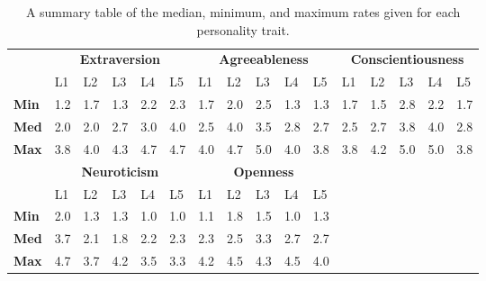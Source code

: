 \begin{table}[hbt!]
    \renewcommand{\arraystretch}{1}
    \begin{center}
        \begin{tabular}{p{}|
        p{}|p{}|p{}|p{}|p{}||
        p{}|p{}|p{}|p{}|p{}||
        p{}|p{}|p{}|p{}|p{}|}
            \cline{2-16}
            & \multicolumn{5}{c||}{\textbf{Extraversion}} & \multicolumn{5}{c||}{\textbf{Agreeableness}}
            & \multicolumn{5}{c|}{\textbf{Conscientiousness}} \\
            \cline{2-16}
            & L1 & L2 & L3 & L4 & L5 & L1 & L2 & L3 & L4 & L5 & L1 & L2 & L3 & L4 & L5      \\
            \cline{2-16}
            \textbf{Min}    & 1.2 & 1.7 & 1.3 & 2.2 & 2.3 & 1.7 & 2.0 & 2.5 & 1.3 & 1.3 & 1.7 & 1.5 & 2.8 & 2.2 & 1.7  \\
            \textbf{Med}    & 2.0 & 2.0 & 2.7 & 3.0 & 4.0 & 2.5 & 4.0 & 3.5 & 2.8 & 2.7 & 2.5 & 2.7 & 3.8 & 4.0 & 2.8  \\
            \textbf{Max}    & 3.8 & 4.0 & 4.3 & 4.7 & 4.7 & 4.0 & 4.7 & 5.0 & 4.0 & 3.8 & 3.8 & 4.2 & 5.0 & 5.0 & 3.8 \\
            \cline{2-16}
            \cline{2-11}
            &  \multicolumn{5}{|c||}{\textbf{Neuroticism}} & \multicolumn{5}{|c||}{\textbf{Openness}} \\
            \cline{2-11}
            & L1 & L2 & L3 & L4 & L5 & L1 & L2 & L3 & L4 & L5            \\
            \cline{2-11}
            \textbf{Min}    & 2.0 & 1.3 & 1.3 & 1.0 & 1.0 & 1.1 & 1.8 & 1.5 & 1.0 & 1.3    \\
            \textbf{Med}    & 3.7 & 2.1 & 1.8 & 2.2 & 2.3 & 2.3 & 2.5 & 3.3 & 2.7 & 2.7    \\
            \textbf{Max}    & 4.7 & 3.7 & 4.2 & 3.5 & 3.3 & 4.2 & 4.5 & 4.3 & 4.5 & 4.0    \\
            \cline{2-11}
        \end{tabular}
        \caption[]{A summary table of the median, minimum, and maximum rates given for each personality trait.\footnotemark}
        \label{table:medianMM1}
    \end{center}
\end{table}

